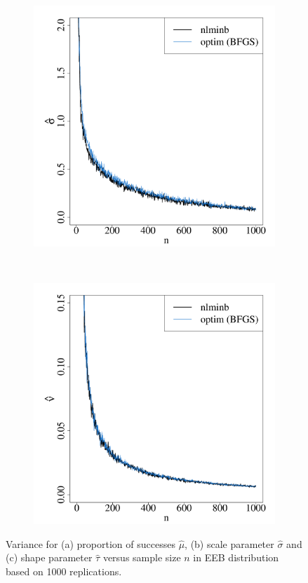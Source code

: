 \documentclass[nojss]{jss}
\begin{document}
\begin{appendix}
\begin{figure}[H]
\begin{subfigure}[h]{0.49\textwidth}
        \includegraphics[width=\textwidth]{article-varEEBb}
        \caption{\label{fig:varEEBb}}
    \end{subfigure}
    ~
    \begin{subfigure}[h]{0.49\textwidth}
        \includegraphics[width=\textwidth]{article-varEEBc}
        \caption{\label{fig:varEEBc}}
    \end{subfigure}
\caption{\label{fig:varEEB} Variance for (a) proportion of successes $\hat{\mu}$, (b) scale parameter $\hat{\sigma}$ and (c) shape parameter $\hat{\tau}$ versus sample size $n$ in EEB distribution based on 1000 replications.}
\vspace{90pt}
\end{figure}

\end{appendix}

\end{document}
